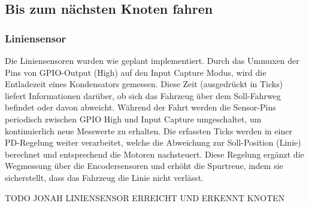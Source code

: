 \newpage

\subsection{Bis zum nächsten Knoten fahren}

\subsubsection{Liniensensor}

Die Liniensensoren wurden wie geplant implementiert. Durch das Ummuxen der Pins von GPIO-Output (High) auf den Input Capture Modus, wird die Entladezeit eines Kondensators gemessen. Diese Zeit (ausgedrückt in Ticks) liefert Informationen darüber, ob sich das Fahrzeug über dem Soll-Fahrweg befindet oder davon abweicht. Während der Fahrt werden die Sensor-Pins periodisch zwischen GPIO High und Input Capture umgeschaltet, um kontinuierlich neue Messwerte zu erhalten. Die erfassten Ticks werden in einer PD-Regelung weiter verarbeitet, welche die Abweichung zur Soll-Position (Linie) berechnet und entsprechend die Motoren nachsteuert. Diese Regelung ergänzt die Wegmessung über die Encodersensoren und erhöht die Spurtreue, indem sie sicherstellt, dass das Fahrzeug die Linie nicht verlässt.

TODO JONAH LINIENSENSOR ERREICHT UND ERKENNT KNOTEN
